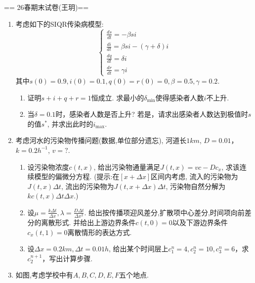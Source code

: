 == 26春期末试卷(王玥)==
\begin{enumerate}
\item 考虑如下的SIQR传染病模型:
$$\begin{cases}
    \frac{ds}{dt}=-\beta si\\
    \frac{di}{dt}=\beta si-(\gamma+\delta)i\\
    \frac{dq}{dt}=\delta i\\
    \frac{dr}{dt}=\gamma i
\end{cases}$$
其中$s(0)=0.9,i(0)=0.1,q(0)=r(0)=0,\beta=0.5,\gamma=0.2.$
\begin{enumerate}[label=(\arabic*)]
    \item 证明$s+i+q+r=1$恒成立. 求最小的$\delta_{\min}$使得感染者人数$i$不上升.
    \item 当$\delta=0.1$时，感染者人数是否上升? 若是，请求出感染者人数达到极值时$s$的值$s^*$, 并求出此时的$i_{\max}$.
\end{enumerate}
\item 考虑河水的污染物传播问题(数据,单位部分遗忘), 河道长$1km$, $D=0.01$，$k=0.2h^{-1}$, $v=?$.
\begin{enumerate}[label=(\arabic*)]
    \item 设污染物浓度$c(t,x)$, 给出污染物通量满足$J(t,x)=vc-Dc_x$, 求该连续模型的偏微分方程.
    (提示:在$[x+\Delta x]$区间内考虑, 流入的污染物为$J(t,x)\Delta t$, 
    流出的污染物为$J(t,x+\Delta x)\Delta t$, 污染物自然分解为$kc(t,x)\Delta t\Delta x$.)
    \item 设$\mu=\frac{k\Delta t}{\Delta x}, \lambda=\frac{D\Delta t}{\Delta x^2}$.
    给出按传播项迎风差分,扩散项中心差分,时间项向前差分的离散形式. 
    并给出上游边界条件$c(t,0)=0$以及下游边界条件$c_x(t,1)=0$离散情形的表达方式.
    \item 设$\Delta x=0.2km,\Delta t=0.01h$, 给出某个时间层上$c_1^n=4,c_2^n=10,c_3^n=6$，求$c_2^{n+1}$，写出计算步骤.
\end{enumerate} 
\item 如图,考虑学校中有$A,B,C,D,E,F$五个地点.
\begin{enumerate}[label=(\arabic*)]

\end{enumerate}
\end{enumerate}
